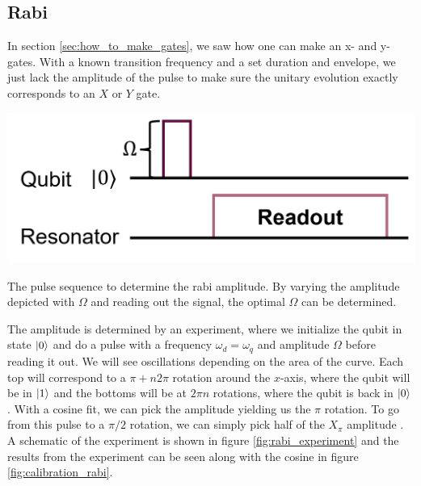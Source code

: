 \subsection{Rabi}
In section \ref{sec:how_to_make_gates}, we saw how one can make an x- and y-gates. With a known transition frequency and a set duration and envelope, we just lack the amplitude of the pulse to make sure the unitary evolution exactly corresponds to an $X$ or $Y$ gate. 
\begin{marginfigure}[5 cm]
    \centering
    \includegraphics[]{Figs/circuits/rabi.png}
    \caption{The pulse sequence to determine the rabi amplitude. By varying the amplitude depicted with $\Omega$ and reading out the signal, the optimal $\Omega$ can be determined.}
    \label{fig:rabi_experiment}
\end{marginfigure}
The amplitude is determined by an experiment, where we initialize the qubit in state $\ket{0}$ and do a pulse with a frequency $\omega_d = \omega_q$ and amplitude $\Omega$ before reading it out. We will see oscillations depending on the area of the curve. Each top will correspond to a $\pi +n2\pi$ rotation around the $x$-axis, where the qubit will be in $\ket{1}$ and the bottoms will be at $2\pi n$ rotations, where the qubit is back in $\ket{0}$. With a cosine fit, we can pick the amplitude yielding us the $\pi$ rotation. To go from this pulse to a $\pi/2$ rotation, we can simply pick half of the $X_{\pi}$ amplitude \cite{naghiloo_introduction_2019}. A schematic of the experiment is shown in figure \ref{fig:rabi_experiment} and the results from the experiment can be seen along with the cosine in figure \ref{fig:calibration_rabi}.
